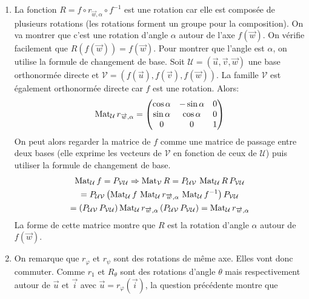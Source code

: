 \begin{enumerate}
\item La fonction $R=f\circ r_{\overrightarrow{w},\alpha}\circ f^{-1}$ est une rotation car elle est composée de plusieurs rotations (les rotations forment un groupe pour la composition). On va montrer que c'est une rotation d'angle $\alpha$ autour de l'axe $f(\overrightarrow{w})$.\newline
On vérifie facilement que $R(f(\overrightarrow{w}))=f(\overrightarrow{w})$. Pour montrer que l'angle est $\alpha$, on utilise la formule de changement de base.\newline
Soit $\mathcal U=(\overrightarrow{u},\overrightarrow{v},\overrightarrow{w})$ une base orthonormée directe et $\mathcal V=(f(\overrightarrow{u}),f(\overrightarrow{v}),f(\overrightarrow{w}))$. La famille $\mathcal V$ est également orthonormée directe car $f$ est une rotation. Alors:
\begin{displaymath}
\operatorname{Mat}_{\mathcal U} r_{\overrightarrow{w},\alpha} =
\begin{pmatrix}
 \cos \alpha & -\sin \alpha & 0 \\
 \sin \alpha & \cos \alpha & 0\\
0 & 0 & 1
\end{pmatrix}
\end{displaymath}
On peut alors regarder la matrice de $f$ comme une matrice de passage entre deux bases (elle exprime les vecteurs de $\mathcal V$ en fonction de ceux de $\mathcal U$) puis utiliser la formule de changement de base.
\begin{multline*}
 \operatorname{Mat}_{\mathcal U}f = P_{\mathcal V \mathcal U} \Rightarrow 
 \operatorname{Mat}_{\mathcal V}R=  P_{\mathcal U \mathcal V}\,\operatorname{Mat}_{\mathcal U}R\,P_{\mathcal V \mathcal U}\\
=P_{\mathcal U \mathcal V} 
    \left( \operatorname{Mat}_{\mathcal U}f \, \operatorname{Mat}_{\mathcal U}r_{\overrightarrow{w},\alpha} \, \operatorname{Mat}_{\mathcal U}f^{-1}\right) P_{\mathcal V \mathcal U}\\
= \left( P_{\mathcal U \mathcal V}\,P_{\mathcal V \mathcal U}\right)
  \operatorname{Mat}_{\mathcal U}r_{\overrightarrow{w},\alpha}
\left(  P_{\mathcal U \mathcal V}\,P_{\mathcal V \mathcal U} \right) 
=\operatorname{Mat}_{\mathcal U}r_{\overrightarrow{w},\alpha}
\end{multline*}
La forme de cette matrice montre que $R$ est la rotation d'angle $\alpha$ autour de $f(\overrightarrow{w})$.
\item On remarque que $r_\varphi$ et $r_\psi$ sont des rotations de même axe. Elles vont donc commuter. Comme $r_1$ et $R_\theta$ sont des rotations d'angle $\theta$ mais respectivement autour de $\overrightarrow{u}$ et $\overrightarrow{i}$ avec $\overrightarrow{u}=r_\varphi(\overrightarrow{i})$, la question précédente montre que

\end{enumerate}
